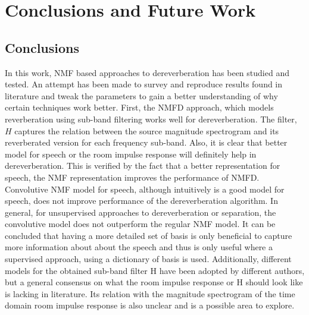 
\chapter{Conclusions and Future Work}  %

\ifpdf
    \graphicspath{{Chapter1/Figs/Raster/}{Chapter1/Figs/PDF/}{Chapter1/Figs/}}
\else
    \graphicspath{{Chapter1/Figs/Vector/}{Chapter1/Figs/}}
\fi


\section{Conclusions}
In this work, NMF based approaches to dereverberation has been studied and tested. An attempt has been made to survey and reproduce results found in literature and tweak the parameters to gain a better understanding of why certain techniques work better. 
First, the NMFD approach, which models reverberation using sub-band filtering works well for dereverberation. The filter, $H$ captures the relation between the source magnitude spectrogram and its reverberated version for each frequency sub-band. 
Also, it is clear that  better model for speech or the room impulse response will definitely help in dereverberation. This is verified by the fact that a better representation for speech, the NMF representation improves the performance of NMFD. 
Convolutive NMF model for speech, although intuitively is a good model for speech, does not improve performance of the dereverberation algorithm. In general, for unsupervised approaches to dereverberation or separation, the convolutive model does not outperform the regular NMF model. It can be concluded that having a more detailed set of basis is only beneficial to capture more information about about the speech and thus is only useful where a supervised approach, using a dictionary of basis is used.
Additionally, different models for the obtained sub-band filter H have been adopted by different authors, but a general consensus on what the room impulse response or H should look like is lacking in literature. Its relation with the magnitude spectrogram of the time domain room impulse response is also unclear and is a possible area to explore. 

